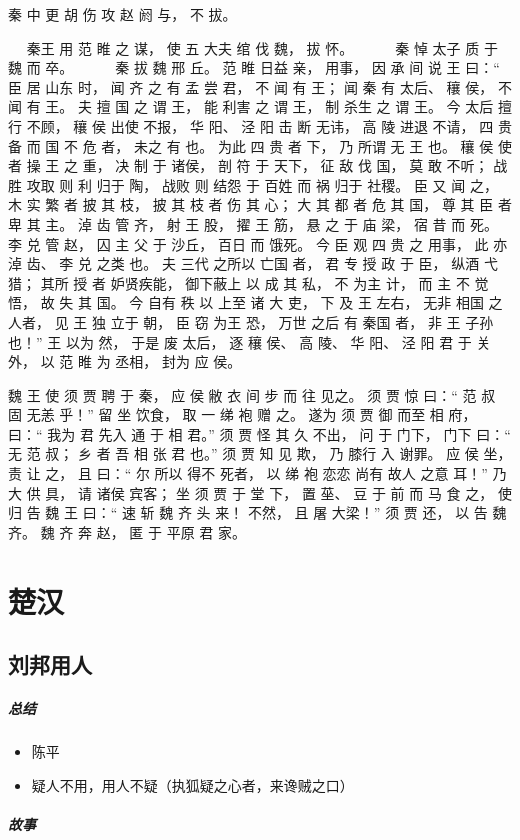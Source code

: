 \documentclass[UTF8,a4paper,8pt]{ctexbook}
\begin{document}
			秦 中 更 胡 伤 攻 赵 阏 与， 不 拔。 
			 
		  　 秦王 用 范 睢 之 谋， 使 五 大夫 绾 伐 魏， 拔 怀。 
		  　 
		  　 秦 悼 太子 质 于 魏 而 卒。 
		  　 
		  　 秦 拔 魏 邢 丘。 范 睢 日益 亲， 用事， 因 承 间 说 王 曰：“ 臣 居 山东 时， 闻 齐 之 有 孟 尝 君， 不 闻 有 王； 闻 秦 有 太后、 穰 侯， 不 闻 有 王。 夫 擅 国 之 谓 王， 能 利害 之 谓 王， 制 杀生 之 谓 王。 今 太后 擅 行 不顾， 穰 侯 出使 不报， 华 阳、 泾 阳 击 断 无讳， 高 陵 进退 不请， 四 贵 备 而 国 不 危 者， 未之 有 也。 为此 四 贵 者 下， 乃 所谓 无 王 也。 穰 侯 使者 操 王 之 重， 决 制 于 诸侯， 剖 符 于 天下， 征 敌 伐 国， 莫 敢 不听； 战胜 攻取 则 利 归于 陶， 战败 则 结怨 于 百姓 而 祸 归于 社稷。 臣 又 闻 之， 木 实 繁 者 披 其 枝， 披 其 枝 者 伤 其 心； 大 其 都 者 危 其 国， 尊 其 臣 者 卑 其 主。 淖 齿 管 齐， 射 王 股， 擢 王 筋， 悬 之 于 庙 梁， 宿 昔 而 死。 李 兑 管 赵， 囚 主 父 于 沙丘， 百日 而 饿死。 今 臣 观 四 贵 之 用事， 此 亦 淖 齿、 李 兑 之类 也。 夫 三代 之所以 亡国 者， 君 专 授 政 于 臣， 纵酒 弋 猎； 其所 授 者 妒贤疾能， 御下蔽上 以 成 其 私， 不 为主 计， 而 主 不 觉悟， 故 失 其 国。 今 自有 秩 以 上至 诸 大 吏， 下 及 王 左右， 无非 相国 之 人者， 见 王 独 立于 朝， 臣 窃 为王 恐， 万世 之后 有 秦国 者， 非 王 子孙 也！” 王 以为 然， 于是 废 太后， 逐 穰 侯、 高 陵、 华 阳、 泾 阳 君 于 关外， 以 范 睢 为 丞相， 封为 应 侯。
			
			魏 王 使 须 贾 聘 于 秦， 应 侯 敝 衣 间 步 而 往 见之。 须 贾 惊 曰：“ 范 叔 固 无恙 乎！” 留 坐 饮食， 取 一 绨 袍 赠 之。 遂为 须 贾 御 而至 相 府， 曰：“ 我为 君 先入 通 于 相 君。” 须 贾 怪 其 久 不出， 问 于 门下， 门下 曰：“ 无 范 叔； 乡 者 吾 相 张 君 也。” 须 贾 知 见 欺， 乃 膝行 入 谢罪。 应 侯 坐， 责 让 之， 且 曰：“ 尔 所以 得不 死者， 以 绨 袍 恋恋 尚有 故人 之意 耳！” 乃 大 供 具， 请 诸侯 宾客； 坐 须 贾 于 堂 下， 置 莝、 豆 于 前 而 马 食 之， 使 归 告 魏 王 曰：“ 速 斩 魏 齐 头 来！ 不然， 且 屠 大梁！” 须 贾 还， 以 告 魏 齐。 魏 齐 奔 赵， 匿 于 平原 君 家。

			
	\section{楚汉}
		\subsection{刘邦用人}
			\subparagraph{总结}
				\begin{itemize}
					\item 陈平
					\item 疑人不用，用人不疑（执狐疑之心者，来谗贼之口）
				\end{itemize}
			\subparagraph{故事}
				
\end{document}

